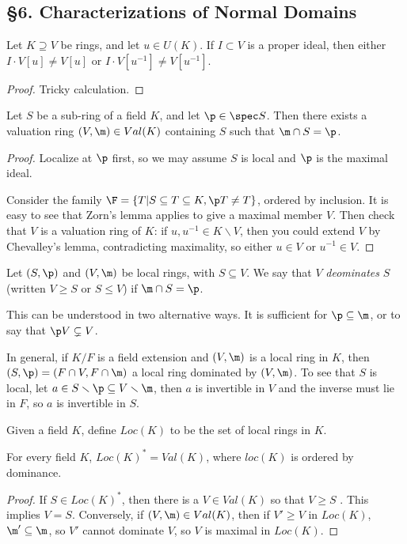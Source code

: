  \subsection{\S 6. Characterizations of Normal Domains}
 \begin{lemma}[Chevalley]
   Let $K\supseteq V$ be rings, and let $u\in U(K)$. If $I\subset V$ is a proper ideal, then
   either $I\cdot V[u]\neq V[u]$ or $I\cdot V[u^{-1}]\neq V[u^{-1}]$.
 \end{lemma}
 \begin{proof}
   Tricky calculation. \anton{}
 \end{proof}
 \begin{theorem}
   Let $S$ be a sub-ring of a field $K$, and let $\p\in\spec S$. Then there exists a
   valuation ring $(V,\m)\in Val(K)$ containing $S$ such that $\m\cap S=\p$.
 \end{theorem}
 \begin{proof}
   Localize at $\p$ first, so we may assume $S$ is local and $\p$ is the maximal ideal.

   Consider the family $\F=\{T| S\subseteq T\subseteq K, \p T\neq T\}$, ordered by
   inclusion. It is easy to see that Zorn's lemma applies to give a maximal member $V$.
   Then check that $V$ is a valuation ring of $K$: if $u,u^{-1}\in K\smallsetminus V$,
   then you could extend $V$ by Chevalley's lemma, contradicting maximality, so either
   $u\in V$ or $u^{-1}\in V$.
 \end{proof}
 \begin{definition}
   Let $(S,\p)$ and $(V,\m)$ be local rings, with $S\subseteq V$. We say that $V$
   \emph{deominates} $S$ (written $V\ge S$ or $S\le V$) if $\m\cap S=\p$.
 \end{definition}
 This can be understood in two alternative ways. It is sufficient for $\p\subseteq \m$,
 or to say that $\p V\subsetneq V$.

 In general, if $K/F$ is a field extension and $(V,\m)$ is a local ring in $K$, then
 $(S,\p)=(F\cap V,F\cap \m)$ a local ring dominated by $(V,\m)$. To see that $S$ is
 local, let $a\in S\smallsetminus \p\subseteq V\smallsetminus \m$, then $a$ is invertible
 in $V$ and the inverse must lie in $F$, so $a$ is invertible in $S$.

 Given a field $K$, define $Loc(K)$ to be the set of local rings in $K$.
 \begin{theorem}
   For every field $K$, $Loc(K)^*=Val(K)$, where $loc(K)$ is ordered by dominance.
 \end{theorem}
 \begin{proof}
   If $S\in Loc(K)^*$, then there is a $V\in Val(K)$ so that $V\ge S$ \anton{}. This
   implies $V=S$. Conversely, if $(V,\m)\in Val(K)$, then if $V'\ge V$ in $Loc(K)$,
   $\m'\subseteq \m$, so $V'$ cannot dominate $V$, so $V$ is maximal in $Loc(K)$.
 \end{proof}
 \setcounter{lecture}{36}
